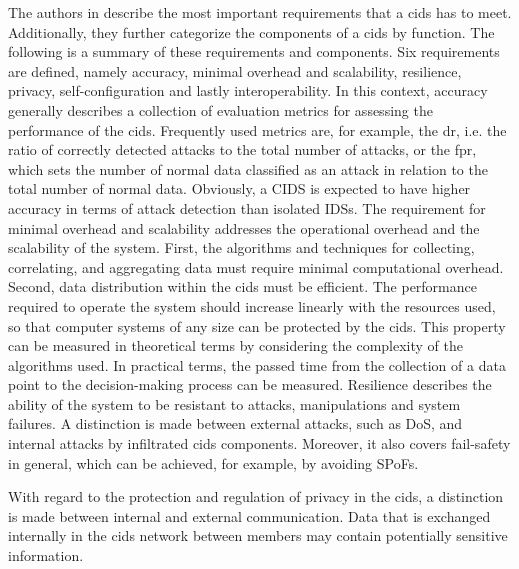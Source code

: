 The authors in \cite{Vasilomanolakis2015SkipMon} describe the most important requirements that a \gls{cids} has to meet. Additionally, they further categorize the components of a \gls{cids} by function. The following is a summary of these requirements and components. Six requirements are defined, namely accuracy, minimal overhead and scalability, resilience, privacy, self-configuration and lastly interoperability. In this context, accuracy generally describes a collection of evaluation metrics for assessing the performance of the \gls{cids}. Frequently used metrics are, for example, the \gls{dr}, i.e. the ratio of correctly detected attacks to the total number of attacks, or the \gls{fpr}, which sets the number of normal data classified as an attack in relation to the total number of normal data. Obviously, a CIDS is expected to have higher accuracy in terms of attack detection than isolated IDSs. The requirement for minimal overhead and scalability addresses the operational overhead and the scalability of the system. First, the algorithms and techniques for collecting, correlating, and aggregating data must require minimal computational overhead. Second, data distribution within the \acrshort{cids} must be efficient. The performance required to operate the system should increase linearly with the resources used, so that computer systems of any size can be protected by the \gls{cids}. This property can be measured in theoretical terms by considering the complexity of the algorithms used. In practical terms, the passed time from the collection of a data point to the decision-making process can be measured. Resilience describes the ability of the system to be resistant to attacks, manipulations and system failures. A distinction is made between external attacks, such as DoS, and internal attacks by infiltrated \gls{cids} components. Moreover, it also covers fail-safety in general, which can be achieved, for example, by avoiding SPoFs. 

With regard to the protection and regulation of privacy in the \gls{cids}, a distinction is made between internal and external communication. Data that is exchanged internally in the \gls{cids} network between members may contain potentially sensitive information.

